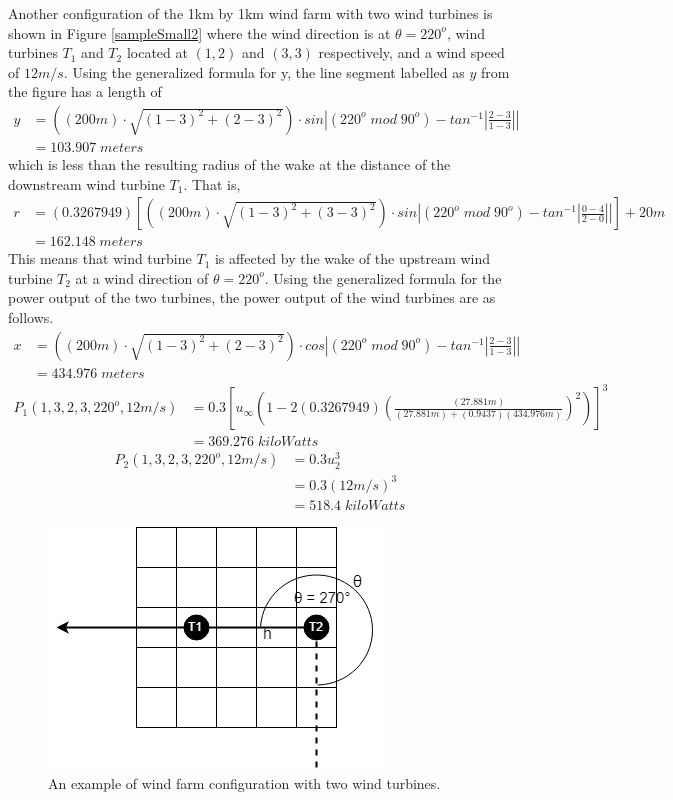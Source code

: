     Another configuration of the 1km by 1km wind farm with two wind turbines is shown in Figure \ref{sampleSmall2} where the wind direction is at $\theta=220^o$, wind turbines $T_1$ and $T_2$ located at $(1,2)$ and $(3,3)$ respectively, and a wind speed of $12m/s$. Using the generalized formula for y, the line segment labelled as $y$ from the figure has a length of
    \begin{align*}
    	y
    	&= \left((200m)\cdot \sqrt{(1-3)^2+(2-3)^2}\right)\cdot sin\left| (220^o\;mod\;90^o)-tan^{-1} \left| \frac{2-3}{1-3} \right| \right| \\
    	&= 103.907\;meters
    \end{align*}
    which is less than the resulting radius of the wake at the distance of the downstream wind turbine $T_1$. That is,
    \begin{align*}
    	r
    	&= (0.3267949)\left[ \left((200m)\cdot \sqrt{(1-3)^2+(3-3)^2}\right)\cdot sin\left| (220^o\;mod\;90^o)-tan^{-1} \left| \frac{0-4}{2-0} \right| \right| \right] + 20m \\
    	&= 162.148\;meters
    \end{align*}
    This means that wind turbine $T_1$ is affected by the wake of the upstream wind turbine $T_2$ at a wind direction of $\theta=220^o$. Using the generalized formula for the power output of the two turbines, the power output of the wind turbines are as follows.
    \begin{align*}
        x
        &=\left((200m)\cdot \sqrt{(1-3)^2+(2-3)^2}\right)\cdot cos\left| (220^o\;mod\;90^o)-tan^{-1} \left| \frac{2-3}{1-3} \right| \right| \\
        &=434.976\;meters
    \end{align*}
    \begin{align*}
    	P_1(1,3,2,3,220^o,12m/s)
    	&= 0.3\left[ u_\infty\left(1 - 2(0.3267949)\left(\frac{(27.881m)}{(27.881m)+(0.9437) (434.976m)}\right)^2\right) \right]^3 \\
    	&= 369.276\;kiloWatts
    \end{align*}
    \begin{align*}
    	P_2(1,3,2,3,220^o,12m/s)
    	&= 0.3u_2^3 \\
    	&= 0.3(12m/s)^3 \\ 
    	&= 518.4\;kiloWatts
    \end{align*}
    
    \begin{figure}[H]
        \centering
        \includegraphics[width=0.5\linewidth]{Figures/sampleSmall3.png}
        \caption{An example of wind farm configuration with two wind turbines.}
        \label{sampleSmall3}
    \end{figure}
    
